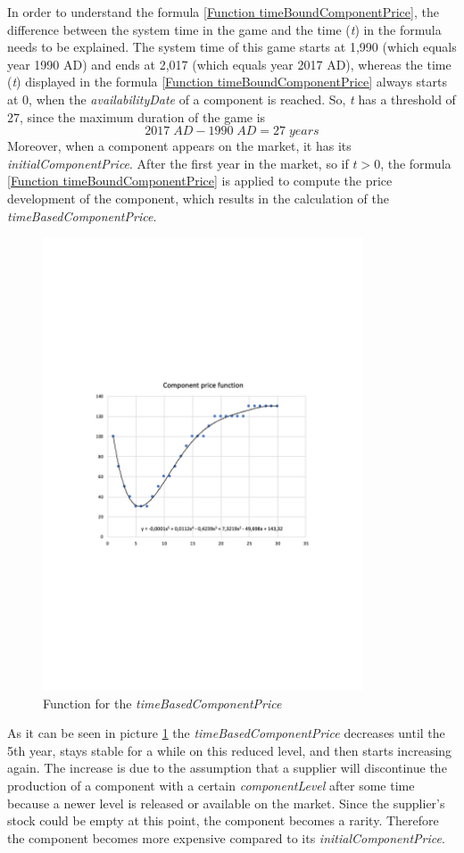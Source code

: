 In order to understand the formula \ref{Function timeBoundComponentPrice}, the difference between the system time in the game and the time (\textit{t}) in the formula needs to be explained. The system time of this game starts at 1,990 (which equals year 1990 AD) and ends at 2,017 (which equals year 2017 AD), whereas the time (\textit{t}) displayed in the formula \ref{Function timeBoundComponentPrice} always starts at $0$, when the \textit{availabilityDate} of a component is reached. So, \textit{t} has a threshold of 27, since the maximum duration of the game is
\begin{equation}
    2017 \; AD - 1990 \; AD = 27 \; years
\end{equation}
Moreover, when a component appears on the market, it has its \textit{initialComponentPrice}. After the first year in the market, so if \textit{$t > 0$}, the formula \ref{Function timeBoundComponentPrice} is applied to compute the price development of the component, which results in the calculation of the \textit{timeBasedComponentPrice}.
\begin{figure}
    \centering
	\includegraphics[width=9.5cm]{images/timeBasedComponentPriceFunction.pdf}
	\caption{Function for the \textit{timeBasedComponentPrice}}
	\label{img:timeBasedComponentPriceFunction}
\end{figure}
As it can be seen in picture \ref{img:timeBasedComponentPriceFunction} the \textit{timeBasedComponentPrice} decreases until the 5th year, stays stable for a while on this reduced level, and then starts increasing again. The increase is due to the assumption that a supplier will discontinue the production of a component with a certain \textit{componentLevel} after some time because a newer level is released or available on the market. Since the supplier’s stock could be empty at this point, the component becomes a rarity. Therefore the component becomes more expensive compared to its \textit{initialComponentPrice}.\\
